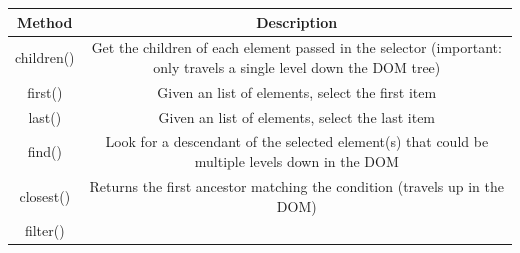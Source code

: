 \documentclass[
]{book}
\begin{document}
\begin{longtable}[]{@{}cc@{}}
\toprule
\begin{minipage}[b]{0.42\columnwidth}\centering
Method\strut
\end{minipage} & \begin{minipage}[b]{0.52\columnwidth}\centering
Description\strut
\end{minipage}\tabularnewline
\midrule
\endhead
\begin{minipage}[t]{0.42\columnwidth}\centering
children()\strut
\end{minipage} & \begin{minipage}[t]{0.52\columnwidth}\centering
Get the children of each element passed in the selector (important: only travels a single level down the DOM tree)\strut
\end{minipage}\tabularnewline
\begin{minipage}[t]{0.42\columnwidth}\centering
first()\strut
\end{minipage} & \begin{minipage}[t]{0.52\columnwidth}\centering
Given an list of elements, select the first item\strut
\end{minipage}\tabularnewline
\begin{minipage}[t]{0.42\columnwidth}\centering
last()\strut
\end{minipage} & \begin{minipage}[t]{0.52\columnwidth}\centering
Given an list of elements, select the last item\strut
\end{minipage}\tabularnewline
\begin{minipage}[t]{0.42\columnwidth}\centering
find()\strut
\end{minipage} & \begin{minipage}[t]{0.52\columnwidth}\centering
Look for a descendant of the selected element(s) that could be multiple levels down in the DOM\strut
\end{minipage}\tabularnewline
\begin{minipage}[t]{0.42\columnwidth}\centering
closest()\strut
\end{minipage} & \begin{minipage}[t]{0.52\columnwidth}\centering
Returns the first ancestor matching the condition (travels up in the DOM)\strut
\end{minipage}\tabularnewline
\begin{minipage}[t]{0.42\columnwidth}\centering
filter()\strut
\end{minipage} & \begin{minipage}[t]{0.52\columnwidth}\centering

\end{minipage}
\end{longtable}
\end{document}
